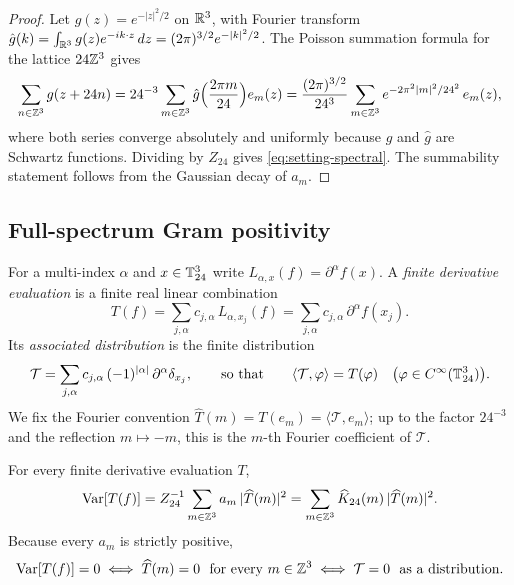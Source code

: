 \begin{proof}
Let $g(z)=e^{-|z|^2/2}$ on $\mathbb R^3$, with Fourier transform $\hat g(k)=\int_{\mathbb R^3}g(z)e^{-ik\cdot z}\,dz=(2\pi)^{3/2}e^{-|k|^2/2}$. The Poisson summation formula for the lattice $24\mathbb Z^3$ gives
\[
\sum_{n\in\mathbb Z^3}g(z+24n)=24^{-3}\sum_{m\in\mathbb Z^3}\hat g\Bigl(\frac{2\pi m}{24}\Bigr)e_m(z)=\frac{(2\pi)^{3/2}}{24^3}\sum_{m\in\mathbb Z^3}e^{-2\pi^2|m|^2/24^2}\,e_m(z),
\]
where both series converge absolutely and uniformly because $g$ and $\hat g$ are Schwartz functions. Dividing by $Z_{24}$ gives \eqref{eq:setting-spectral}. The summability statement follows from the Gaussian decay of $a_m$.
\end{proof}

\subsection{Full-spectrum Gram positivity}\label{ssec:setting-gram}

For a multi-index $\alpha$ and $x\in\mathbb T^3_{24}$ write $L_{\alpha,x}(f)=\partial^\alpha f(x)$. A \emph{finite derivative evaluation} is a finite real linear combination
\begin{equation}\label{eq:setting-T}
T(f)=\sum_{j,\alpha}c_{j,\alpha}\,L_{\alpha,x_j}(f)=\sum_{j,\alpha}c_{j,\alpha}\,\partial^\alpha f(x_j).
\end{equation}
Its \emph{associated distribution} is the finite distribution
\begin{equation}\label{eq:setting-dist}
\mathcal T=\sum_{j,\alpha}c_{j,\alpha}\,(-1)^{|\alpha|}\,\partial^\alpha\delta_{x_j},\qquad\text{so that}\qquad\langle\mathcal T,\varphi\rangle=T(\varphi)\quad\bigl(\varphi\in C^\infty(\mathbb T^3_{24})\bigr).
\end{equation}
We fix the Fourier convention $\widehat T(m)=T(e_m)=\langle\mathcal T,e_m\rangle$; up to the factor $24^{-3}$ and the reflection $m\mapsto-m$, this is the $m$-th Fourier coefficient of $\mathcal T$.

\begin{lemma}\label{lem:setting-gram}
For every finite derivative evaluation $T$,
\begin{equation}\label{eq:setting-var}
\operatorname{Var}[T(f)]=Z_{24}^{-1}\sum_{m\in\mathbb Z^3}a_m\,|\widehat T(m)|^2=\sum_{m\in\mathbb Z^3}\widehat K_{24}(m)\,|\widehat T(m)|^2 .
\end{equation}
Because every $a_m$ is strictly positive,
\begin{equation}\label{eq:setting-var-zero}
\operatorname{Var}[T(f)]=0\iff\widehat T(m)=0\ \text{ for every }m\in\mathbb Z^3\iff\mathcal T=0\ \text{ as a distribution}.
\end{equation}
\end{lemma}

